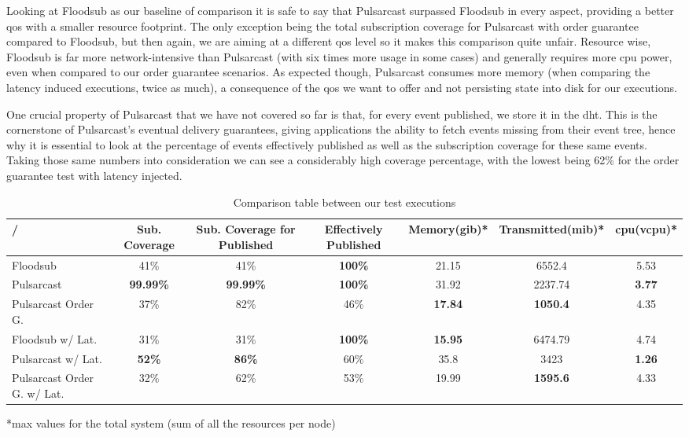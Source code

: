Looking at Floodsub as our baseline of comparison it is safe to say that
Pulsarcast surpassed Floodsub in every aspect, providing a better
\acrshort{qos} with a smaller resource footprint.  The only exception being the
total subscription coverage for Pulsarcast with order guarantee compared to
Floodsub, but then again, we are aiming at a different \acrshort{qos} level so
it makes this comparison quite unfair.  Resource wise, Floodsub is far more
network-intensive than Pulsarcast (with six times more usage in some cases) and
generally requires more \acrshort{cpu} power, even when compared to our order
guarantee scenarios. As expected though, Pulsarcast consumes more memory (when
comparing the latency induced executions, twice as much), a consequence  of the
\acrshort{qos} we want to offer and not persisting state into disk for our
executions.

One crucial property of Pulsarcast that we have not covered so far is that, for
every event published, we store it in the \acrshort{dht}. This is the
cornerstone of Pulsarcast's eventual delivery guarantees, giving applications
the ability to fetch events missing from their event tree, hence why it is
essential to look at the percentage of events effectively published as well as
the subscription coverage for these same events. Taking those same numbers into
consideration we can see a considerably high coverage percentage, with the
lowest being 62\% for the order guarantee test with latency injected.

\begin{table}
\caption{Comparison table between our test executions}
\label{table:evaluation-comparison}
  \begin{center}
   \begin{tabular}{|l| c c c c c c|} 
   \hline
   / & Sub. Coverage &  Sub. Coverage for Published & Effectively Published &
   Memory(\acrshort{gib})* & Transmitted(\acrshort{mib})* & \acrshort{cpu}(\acrshort{vcpu})* \\ [0.5ex] 
   \hline\hline
   Floodsub & 41\% & 41\% & \textbf{100\%} & 21.15 & 6552.4 & 5.53 \\
   Pulsarcast & \textbf{99.99\%} & \textbf{99.99\%} &  \textbf{100\%} & 31.92 & 2237.74 & \textbf{3.77} \\
   Pulsarcast Order G. & 37\% & 82\% & 46\% & \textbf{17.84} & \textbf{1050.4} & 4.35 \\
   \hline
   Floodsub w/ Lat. & 31\% & 31\% & \textbf{100\%} & \textbf{15.95} & 6474.79 & 4.74 \\
   Pulsarcast w/ Lat. & \textbf{52\%} & \textbf{86\%} & 60\% & 35.8 & 3423 & \textbf{1.26}\\
   Pulsarcast Order G. w/ Lat. & 32\% & 62\% & 53\% & 19.99 & \textbf{1595.6} & 4.33 \\
   \hline
  \end{tabular}
  \footnotesize{*max values for the total system (sum of all the resources per node)}
  \end{center}
\end{table}

